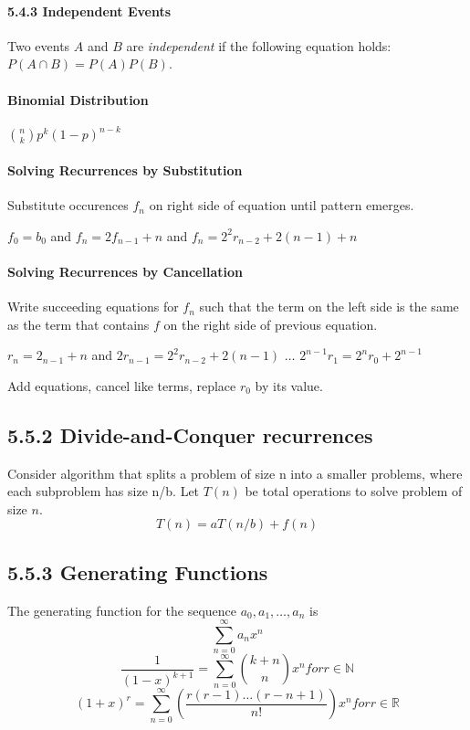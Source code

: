 \documentclass[10pt,twocolumn]{article}
\begin{document}
	\paragraph*{5.4.3 Independent Events}
	Two events $A$ and $B$ are \emph{independent} if the following
        equation holds: $P(A \cap B)=P(A)P(B)$.
	
	\paragraph*{Binomial Distribution}
	$\binom{n}{k}p^k(1-p)^{n-k}$

	\paragraph*{Solving Recurrences by Substitution}
	Substitute occurences $f_n$ on right side of equation until pattern emerges.
	\begin{flushleft}$f_0=b_0$ and $f_n=2f_{n-1}+n$ and $f_n=2^2r_{n-2}+2(n-1)+n$\end{flushleft}
	
	\paragraph*{Solving Recurrences by Cancellation}
	Write succeeding equations for $f_n$ such that the term on the
        left side is the same as the term that contains $f$ on the
        right side of previous equation.
        \begin{flushleft}$r_n=2_{n-1}+n$ and
          $2r_{n-1}=2^2r_{n-2}+2(n-1)$
          $\ldots$ $2^{n-1}r_1=2^nr_0+2^{n-1}$
        \end{flushleft}
	Add equations, cancel like terms, replace $r_0$ by its value.
	
	\subsection*{5.5.2 Divide-and-Conquer recurrences}
	Consider algorithm that splits a problem of size n into a smaller problems, where each subproblem has size n/b.  Let $T(n)$ be total operations to solve problem of size $n$.
		\[T(n)=aT(n/b)+f(n)\]
	
	\subsection*{5.5.3 Generating Functions}
	The generating function for the sequence $a_0, a_1, \ldots, a_n$ is
		\[\sum_{n=0}^\infty a_nx^n\]
		\[\frac{1}{(1-x)^{k+1}}=\sum_{n=0}^\infty \binom{k+n}{n}x^n for r \in \mathbb{N}\]
		\[(1+x)^r=\sum_{n=0}^\infty (\frac{r(r-1)\ldots(r-n+1)}{n!})x^n for r \in \mathbb{R}\]
\end{document}
